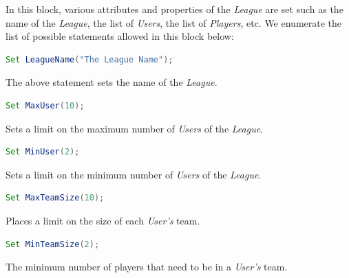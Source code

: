 \documentclass[12pt]{report}
\begin{document}
In this block, various attributes and properties of the \textit{League} are set such as the name of the \textit{League}, the list of \textit{Users}, the list of \textit{Players}, etc. We enumerate the list of possible statements allowed in this block below:

\begin{singlespace}
\begin{lstlisting}[language=Java,label=some-code,caption={Setting league name.}]
Set LeagueName("The League Name");
\end{lstlisting}
\end{singlespace}

The above statement sets the name of the \textit{League}.

\begin{singlespace}
\begin{lstlisting}[language=Java,label=some-code,caption={Setting maximun number of \texttt{Users}.}]
Set MaxUser(10);
\end{lstlisting}
\end{singlespace}

Sets a limit on the maximum number of \textit{Users} of the \textit{League}.

\begin{singlespace}
\begin{lstlisting}[language=Java,label=some-code,caption={Setting minimum number of \texttt{Users}.}]
Set MinUser(2);
\end{lstlisting}
\end{singlespace}

Sets a limit on the minimum number of \textit{Users} of the \textit{League}.

\begin{singlespace}
\begin{lstlisting}[language=Java,label=some-code,caption={Setting maximum size of each team.}]
Set MaxTeamSize(10);
\end{lstlisting}
\end{singlespace}

Places a limit on the size of each \textit{User's} team.

\begin{singlespace}
\begin{lstlisting}[language=Java,label=some-code,caption={Setting minimum size of each team.}]
Set MinTeamSize(2);
\end{lstlisting}
\end{singlespace}

The minimum number of players that need to be in a \textit{User's} team.
\end{document}
